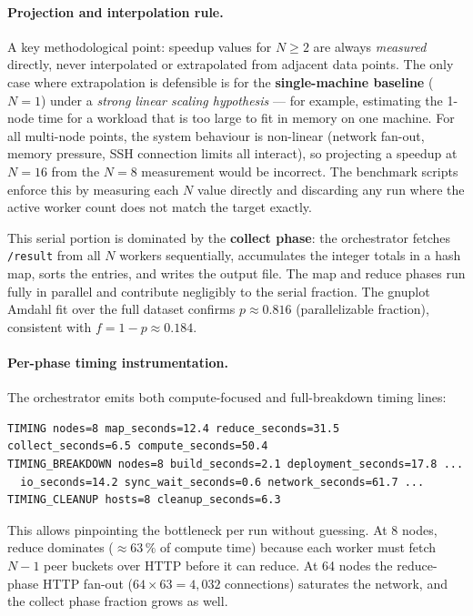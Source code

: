 \documentclass[11pt,a4paper]{article}
\begin{document}
\paragraph{Projection and interpolation rule.}
A key methodological point: speedup values for $N \geq 2$ are always
\emph{measured} directly, never interpolated or extrapolated from adjacent
data points. The only case where extrapolation is defensible is for the
\textbf{single-machine baseline} ($N=1$) under a \emph{strong linear scaling
hypothesis} — for example, estimating the 1-node time for a workload that is
too large to fit in memory on one machine. For all multi-node points, the
system behaviour is non-linear (network fan-out, memory pressure, SSH
connection limits all interact), so projecting a speedup at $N=16$ from the
$N=8$ measurement would be incorrect. The benchmark scripts enforce this by
measuring each $N$ value directly and discarding any run where the active
worker count does not match the target exactly.

This serial portion is dominated by the \textbf{collect phase}: the
orchestrator fetches \texttt{/result} from all $N$ workers sequentially,
accumulates the integer totals in a hash map, sorts the entries, and writes the
output file. The map and reduce phases run fully in parallel and contribute
negligibly to the serial fraction. The gnuplot Amdahl fit over the full dataset
confirms $p \approx 0.816$ (parallelizable fraction), consistent with $f =
1 - p \approx 0.184$.

\paragraph{Per-phase timing instrumentation.}
The orchestrator emits both compute-focused and full-breakdown timing lines:
\begin{lstlisting}[style=codeblock]
TIMING nodes=8 map_seconds=12.4 reduce_seconds=31.5 collect_seconds=6.5 compute_seconds=50.4
TIMING_BREAKDOWN nodes=8 build_seconds=2.1 deployment_seconds=17.8 ...
  io_seconds=14.2 sync_wait_seconds=0.6 network_seconds=61.7 ...
TIMING_CLEANUP hosts=8 cleanup_seconds=6.3
\end{lstlisting}
This allows pinpointing the bottleneck per run without guessing. At 8 nodes,
reduce dominates ($\approx 63\,\%$ of compute time) because each worker must
fetch $N-1$ peer buckets over HTTP before it can reduce. At 64 nodes the
reduce-phase HTTP fan-out ($64 \times 63 = 4{,}032$ connections) saturates the
network, and the collect phase fraction grows as well.
\end{document}
